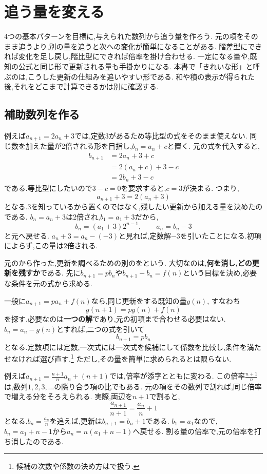 \section{追う量を変える}\label{節：追う量を変える}
4つの基本パターンを目標に,与えられた数列から追う量を作ろう.
元の項をそのまま追うより,別の量を追うと次への変化が簡単になることがある.
階差型にできれば変化を足し戻し,階比型にできれば倍率を掛け合わせる.
一定になる量や,既知の公式と同じ形で更新される量も手掛かりになる.
本書で「きれいな形」と呼ぶのは,こうした更新の仕組みを追いやすい形である.
和や積の表示が得られた後,それをどこまで計算できるかは別に確認する.

\subsection{補助数列を作る}\label{節：補助数列を作る}
例えば$a_{n+1}=2a_n+3$では,定数$3$があるため等比型の式をそのまま使えない.
同じ数を加えた量が2倍される形を目指し,$b_n=a_n+c$と置く.
元の式を代入すると,
\[
  \begin{aligned}
    b_{n+1}&=2a_n+3+c\\
    &=2(a_n+c)+3-c\\
    &=2b_n+3-c
  \end{aligned}
\]
である.等比型にしたいので$3-c=0$を要求すると,$c=3$が決まる.
つまり,
\[
  a_{n+1}+3=2(a_n+3)
\]
となる.$3$を知っているから置くのではなく,残したい更新から加える量を決めたのである.
$b_n=a_n+3$は2倍され,$b_1=a_1+3$だから,
\[
  b_n=(a_1+3)2^{n-1},\qquad a_n=b_n-3
\]
と元へ戻せる.
$a_n+3=a_n-(-3)$と見れば,定数解$-3$を引いたことになる.初項によらず,この量は$2$倍される.

元のから作った,更新を調べるための別のを\textbf{}という.
大切なのは,\textbf{何を消し,どの更新を残すか}である.
先に$b_{n+1}=pb_n$や$b_{n+1}-b_n=f(n)$という目標を決め,必要な条件を元の式から求める.

一般に$a_{n+1}=pa_n+f(n)$なら,同じ更新をする既知の量$g(n)$,
すなわち
\[
  g(n+1)=pg(n)+f(n)
\]
を探す.必要なのは\textbf{一つの解}であり,元の初項まで合わせる必要はない.
$b_n=a_n-g(n)$とすれば,二つの式を引いて
\[
  b_{n+1}=pb_n
\]
となる.定数項には定数,一次式には一次式を候補にして係数を比較し,条件を満たせなければ選び直す.\footnote{候補の次数や係数の決め方はで扱う.}
ただし,その量を簡単に求められるとは限らない.

例えば$a_{n+1}=\frac{n+1}{n}a_n+(n+1)$では,倍率が添字とともに変わる.
この倍率$\frac{n+1}{n}$は,数列$1,2,3,\ldots$の隣り合う項の比でもある.
元の項をその数列で割れば,同じ倍率で増える分をそろえられる.
実際,両辺を$n+1$で割ると,
\[
  \frac{a_{n+1}}{n+1}=\frac{a_n}{n}+1
\]
となる.$b_n=\frac{a_n}{n}$を追えば,更新は$b_{n+1}=b_n+1$である.
$b_1=a_1$なので,$b_n=a_1+n-1$から$a_n=n(a_1+n-1)$へ戻せる.
割る量の倍率で,元の倍率を打ち消したのである.

